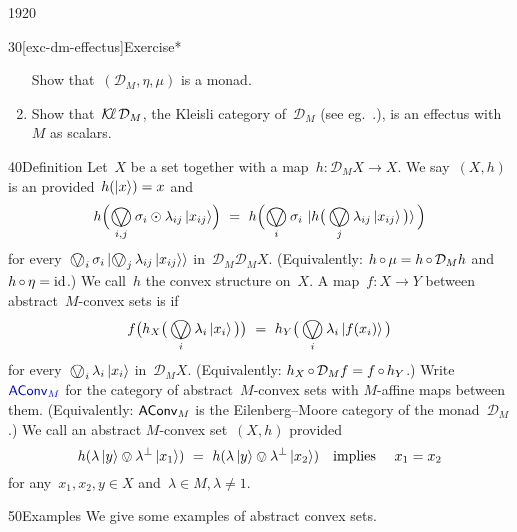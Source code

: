 \begin{parsec}{1920}
\begin{point}{30}[exc-dm-effectus]{Exercise*}
\begin{enumerate}
Show that~$(\mathcal{D}_M, \eta,\mu)$
    is a monad.
\item
    Show that~$\operatorname{\mathcal{K}\!\ell} \mathcal{D}_M$,
    the Kleisli category of~$\mathcal{D}_M$
    (see eg.~\cite[\S 2.6]{basmsc}.),
    is an effectus
    with~$M$ as scalars.
\end{enumerate}
\end{point}
\begin{point}{40}{Definition}%
Let~$X$ be a set together
    with a map~$h\colon \mathcal{D}_M X \to X$.
We say~$(X,h)$ is an 
    provided~$h(\ket{x})=x$
    and
\begin{equation}\label{convex-mult}
    h \Bigl( \bigovee_{i,j} \sigma_i \odot \lambda_{ij} \ket{x_{ij}} \Bigr)
    \ = \ 
    h \Bigl( \bigovee_i \sigma_i \, \ket{
        h\bigl(\, \bigovee_j \lambda_{ij} \ket{x_{ij}}\, \bigr)
    } \, \Bigr)
\end{equation}
for every~$\bigovee_i \sigma_i \ket{\bigovee_j \lambda_{ij} \ket{x_{ij}}}$
    in~$\mathcal{D}_M \mathcal{D}_M X$.
(Equivalently: $h \mathop{\circ} \mu = h \mathop{\circ} \mathcal{D}_M h$
and~$h \mathop{\circ} \eta = \operatorname{id}$.)
    We call~$h$ the convex structure on~$X$.
A map~$f\colon X \to Y$
    between abstract~$M$-convex sets
    is  if
\begin{equation*}
    f \bigl(h_X \bigl(\,\bigovee_i \lambda_i \ket{x_i}\, \bigr)\bigr)
     \ = \ 
     h_Y\bigl(\,\bigovee_i \lambda_i \ket{f(x_i)}\,\bigr)
\end{equation*}
for every~$\bigovee_i \lambda_i \ket{x_i}$ in~$\mathcal{D}_M X$.
(Equivalently: $h_X \mathop{\circ} \mathcal{D}_M f = f \mathop{\circ} h_Y$.)
Write~$\Define{\AConvM}$ for the category
    \index{AConvM@$\AConvM$}
    of abstract~$M$-convex sets with
    $M$-affine maps between them.
(Equivalently: $\AConvM$
    is the Eilenberg--Moore category
    of the monad~$\mathcal{D}_M$.)
We call an abstract $M$-convex set~$(X,h)$ 
provided
\begin{equation*}
    h(\lambda \ket{y} \ovee \lambda^\perp \ket{x_1})\  = \
    h(\lambda \ket{y} \ovee \lambda^\perp \ket{x_2})
    \quad\text{implies}\quad~x_1=x_2
\end{equation*}
    for any~$x_1,x_2,y \in X$ and~$\lambda \in M, \lambda \neq 1$.
\end{point}
\begin{point}{50}{Examples}%
We give some examples of abstract convex sets.
\begin{enumerate}

\end{enumerate}
\end{point}
\end{parsec}
